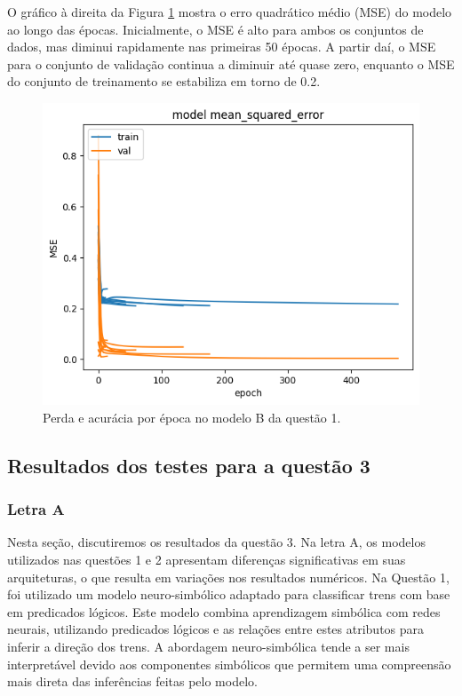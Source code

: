 \documentclass[12pt]{article}
\begin{document}
O gráfico à direita da Figura \ref{fig:model2Amse} mostra o erro quadrático médio (MSE) do modelo ao longo das épocas. Inicialmente, o MSE é alto para ambos os conjuntos de dados, mas diminui rapidamente nas primeiras 50 épocas. A partir daí, o MSE para o conjunto de validação continua a diminuir até quase zero, enquanto o MSE do conjunto de treinamento se estabiliza em torno de 0.2.

\begin{figure}[h]
    \centering
    \includegraphics[width=0.8\linewidth]{MSE.png}
    \caption{Perda e acurácia por época no modelo B da questão 1.}
    \label{fig:model2Amse}
\end{figure}


\subsection{Resultados dos testes para a questão 3}

\subsubsection{Letra A}

Nesta seção, discutiremos os resultados da questão 3.
Na letra A, os modelos utilizados nas questões 1 e 2 apresentam diferenças significativas em suas arquiteturas, o que resulta em variações nos resultados numéricos. Na Questão 1, foi utilizado um modelo neuro-simbólico adaptado para classificar trens com base em predicados lógicos. Este modelo combina aprendizagem simbólica com redes neurais, utilizando predicados lógicos e as relações entre estes atributos para inferir a direção dos trens. A abordagem neuro-simbólica tende a ser mais interpretável devido aos componentes simbólicos que permitem uma compreensão mais direta das inferências feitas pelo modelo.
\end{document}
